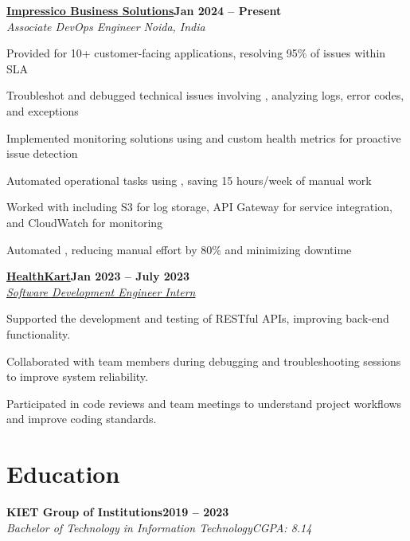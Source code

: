 \documentclass[letterpaper,10pt]{article}
\newcommand{\heading}[2]{
  \hspace{10pt}#1\hfill#2\\
}
\newcommand{\headingBf}[2]{
  \heading{\textbf{#1}}{\textbf{#2}}
}
\newcommand{\headingIt}[2]{
  \heading{\textit{#1}}{\textit{#2}}
}
\newenvironment{resume_list}{
  \vspace{-7pt}
  \begin{itemize}[itemsep=-2px, parsep=1pt, leftmargin=30pt]
}{
  \end{itemize}
}
\begin{document}
\headingBf{\href{https://www.impressico.com}{Impressico Business Solutions}}{Jan 2024 -- Present}  
\headingIt{Associate DevOps Engineer }{Noida, India}  
\begin{resume_list}  
  \item Provided \textbf{\color{accentTitle}{technical support}} for 10+ customer-facing applications, resolving 95\% of issues within SLA
 \item Troubleshot and debugged technical issues involving \textbf{\color{accentTitle}{Kubernetes, OpenSearch}}, analyzing logs, error codes, and exceptions
  \item Implemented monitoring solutions using \textbf{\color{accentTitle}{CloudWatch}} and custom health metrics for proactive issue detection
  \item Automated operational tasks using \textbf{\color{accentTitle}{Python and Shell scripts}}, saving 15 hours/week of manual work
  \item Worked with \textbf{\color{accentTitle}{AWS services}} including S3 for log storage, API Gateway for service integration, and CloudWatch for monitoring
 \item Automated \textbf{\color{accentTitle}{EKS cluster and Jenkins upgrades}}, reducing manual effort by 80\% and minimizing downtime
\end{resume_list}


\headingBf{\href{https://www.healthcart.com}{HealthKart}}{Jan 2023 -- July 2023} 
\headingIt{\href {https://drive.google.com/file/d/1Iz83NKtrG7A1KG_rK0P8s_sAquzRm_OY/view?usp=sharing}{Software Development Engineer Intern}}{}
\begin{resume_list}
  \item Supported the development and testing of RESTful APIs, improving back-end functionality.
  \item Collaborated with team members during debugging and troubleshooting sessions to improve system reliability.  
  \item Participated in code reviews and team meetings to understand project workflows and improve coding standards.  
\end{resume_list}


\section{Education}

\headingBf{KIET Group of Institutions}{2019 -- 2023}
\headingIt{Bachelor of Technology in Information Technology}{CGPA: 8.14}
\end{document}
